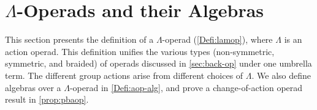 \label{part:op-with-eq}

\section{\texorpdfstring{$\Lambda$}{L}-Operads and their Algebras}

This section presents the definition of a $\Lambda$-operad (\cref{Defi:lamop}), where $\Lambda$ is an action operad.
This definition unifies the various types (non-symmetric, symmetric, and braided) of operads discussed in \cref{sec:back-op} under one umbrella term.
The different group actions arise from different choices of $\Lambda$.
We also define algebras over a $\Lambda$-operad in \cref{Defi:aop-alg}, and prove a change-of-action operad result in \cref{prop:pbaop}.



